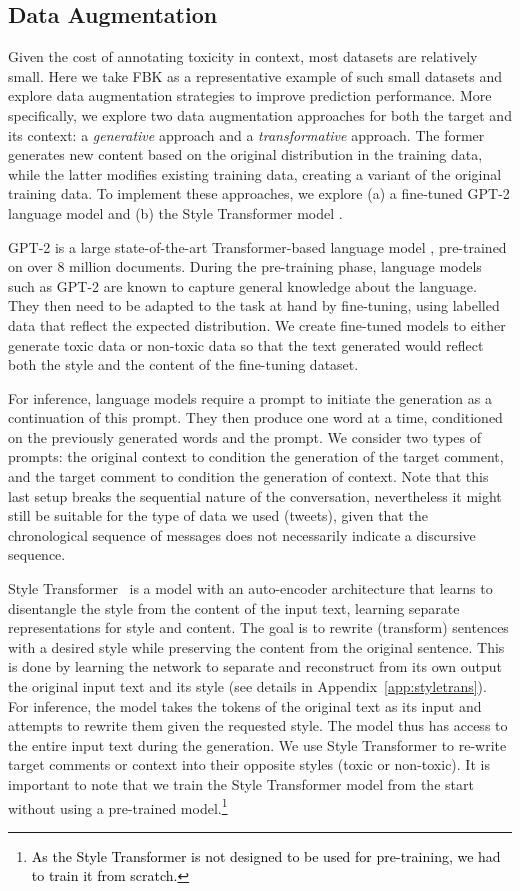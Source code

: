 \documentclass[acmsmall]{acmart}
\newcommand{\red}[1]{\textcolor{black}{#1}}
\begin{document}
\subsection{Data Augmentation}\label{subsec:data-aug}
Given the cost of annotating toxicity in context, most datasets are relatively small. Here we take FBK as a representative example of such small datasets and  explore data augmentation strategies to improve  prediction performance.
More specifically, we explore two data augmentation approaches for both the target and its context: a \textit{generative} approach and a \textit{transformative} approach. The former generates new content based on the original distribution in the training data, while the latter modifies existing training data, creating a variant of the original training data. To implement these approaches, we explore (a) a fine-tuned GPT-2 \cite{gpt-2} language model and (b) the Style Transformer model \cite{style-transformer}. 

GPT-2 is a large state-of-the-art Transformer-based language model \cite{gpt-2}, pre-trained on over 8 million documents. During the pre-training phase, language models such as GPT-2 are known to capture general knowledge about the language. They then need to be adapted to the task at hand by fine-tuning, using labelled data that reflect the expected distribution. We create fine-tuned models to either generate toxic data or non-toxic data so that the text generated would reflect both the style and the content of the fine-tuning dataset. 

For inference, language models require a prompt to initiate the generation as a continuation of this prompt. They then produce one word at a time, conditioned on the previously generated words and the prompt. We consider two types of prompts: the original context to condition the generation of the target comment, and the target comment to condition the generation of context. Note that this last setup breaks the sequential nature of the conversation, nevertheless it might still be suitable for the type of data we used (tweets), given that the chronological sequence of messages does not necessarily indicate a discursive sequence.

Style Transformer~\cite{style-transformer} is a model with an auto-encoder architecture that learns to disentangle the style from the content of the input text, learning separate representations for style and content. The goal is to rewrite (transform) sentences  with a desired style while preserving the content from the original sentence. This is done by learning the network to separate and reconstruct from its own output the original input text and its style (see details in Appendix~\ref{app:styletrans}). For inference, the model takes the tokens of the original text as its input and attempts to rewrite them given the requested style. The model thus has access to the entire input text during the generation. We use Style Transformer to re-write target comments or context into their opposite styles (toxic or non-toxic). It is important to note that we train the Style Transformer model from the start without using a pre-trained model.\footnote{\red{As the Style Transformer is not designed to be used for pre-training, we had to train it from scratch.}}
\end{document}
